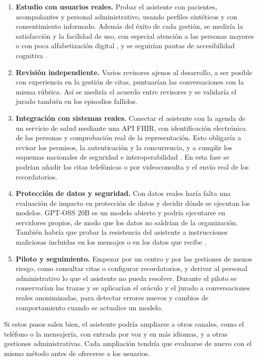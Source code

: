 \begin{enumerate}
  \item \textbf{Estudio con usuarios reales.} Probar el asistente con
        pacientes, acompañantes y personal administrativo, usando perfiles
        sintéticos y con consentimiento informado. Además del éxito de cada
        gestión, se mediría la satisfacción y la facilidad de uso, con especial
        atención a las personas mayores o con poca alfabetización digital
        \citep{vandervaart2017dhl}, y se seguirían pautas de accesibilidad
        cognitiva \citep{w3c2021coga}.
  \item \textbf{Revisión independiente.} Varios revisores ajenos al
        desarrollo, a ser posible con experiencia en la gestión de citas,
        puntuarían las conversaciones con la misma rúbrica. Así se mediría el
        acuerdo entre revisores y se validaría el jurado también en los
        episodios fallidos.
  \item \textbf{Integración con sistemas reales.} Conectar el asistente con la
        agenda de un servicio de salud mediante una API FHIR, con
        identificación electrónica de las personas y comprobación real de la
        representación. Esto obligaría a revisar los permisos, la autenticación
        y la concurrencia, y a cumplir los esquemas nacionales de seguridad e
        interoperabilidad \citep{es2022rd311ens,es2010rd4eni}. En esta fase se
        podrían añadir las citas telefónicas o por videoconsulta y el envío
        real de los recordatorios.
  \item \textbf{Protección de datos y seguridad.} Con datos reales haría falta
        una evaluación de impacto en protección de datos \citep{eu2016gdpr} y
        decidir dónde se ejecutan los modelos. GPT-OSS 20B es un modelo
        abierto y podría ejecutarse en servidores propios, de modo que los
        datos no saldrían de la organización. También habría que probar la
        resistencia del asistente a instrucciones maliciosas incluidas en los
        mensajes o en los datos que recibe \citep{debenedetti2024agentdojo}.
  \item \textbf{Piloto y seguimiento.} Empezar por un centro y por las
        gestiones de menos riesgo, como consultar citas o configurar
        recordatorios, y derivar al personal administrativo lo que el asistente
        no pueda resolver. Durante el piloto se conservarían las trazas y se
        aplicarían el oráculo y el jurado a conversaciones reales anonimizadas,
        para detectar errores nuevos y cambios de comportamiento cuando se
        actualice un modelo.
\end{enumerate}

Si estos pasos salen bien, el asistente podría ampliarse a otros canales, como
el teléfono o la mensajería, con entrada por voz y en más idiomas, y a otras
gestiones administrativas. Cada ampliación tendría que evaluarse de nuevo con el
mismo método antes de ofrecerse a los usuarios.
